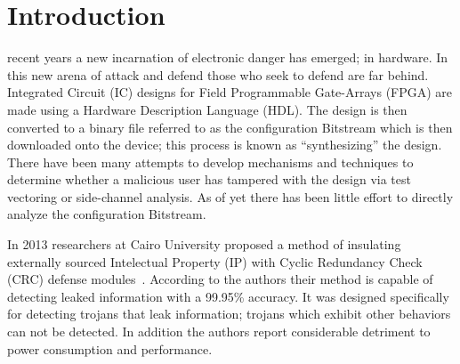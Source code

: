 \documentclass[journal, hidelinks]{IEEEtran}
\begin{document}
%
\IEEEpeerreviewmaketitle



\section{Introduction}
% 
% 
% 
% 
 recent years a new incarnation of electronic danger has emerged; in hardware.
In this new arena of attack and defend those who seek to defend are far behind.
Integrated Circuit (IC) designs for Field Programmable Gate-Arrays (FPGA) are made using a Hardware Description Language (HDL).
The design is then converted to a binary file referred to as the configuration Bitstream which is then downloaded onto the device; this process is known as ``synthesizing'' the design.
There have been many attempts to develop mechanisms and techniques to determine whether a malicious user has tampered with the design via test vectoring or side-channel analysis.
As of yet there has been little effort to directly analyze the configuration Bitstream.

In 2013 researchers at Cairo University proposed a method of insulating externally sourced Intelectual Property (IP) with Cyclic Redundancy Check (CRC) defense modules~\cite{crcDetection}.
According to the authors their method is capable of detecting leaked information with a 99.95\% accuracy.
It was designed specifically for detecting trojans that leak information; trojans which exhibit other behaviors can not be detected.
In addition the authors report considerable detriment to power consumption and performance.
\end{document}
